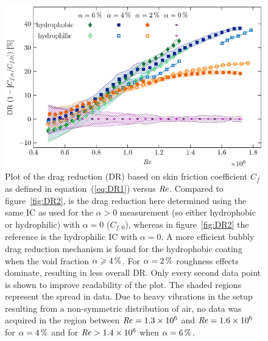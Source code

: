 \begin{figure}
\centering \includegraphics{Figures/fig7}
\caption{Plot of the drag reduction (DR) based on skin friction coefficient $C_f$ as defined in equation~(\ref{eq:DR1}) versus $\mbox{\textit{Re}}$. Compared to figure~\ref{fig:DR2}, is the drag reduction here determined using the same IC as used for the $\alpha > 0$ measurement (so either hydrophobic or hydrophilic) with $\alpha = 0$ ($C_{f,0}$), whereas in figure~\ref{fig:DR2} the reference is the hydrophilic IC with $\alpha = 0$. A more efficient bubbly drag reduction mechanism is found for the hydrophobic coating when the void fraction $\alpha \geqslant \SI{4}{\percent}$. For $\alpha  = \SI{2}{\percent}$ roughness effects dominate, resulting in less overall DR. Only every second data point is shown to improve readability of the plot. The shaded regions represent the spread in data.  Due to heavy vibrations in the setup resulting from a non-symmetric distribution of air, no data was acquired in the region between $\mbox{\textit{Re}} = 1.3\times10^6$ and $\mbox{\textit{Re}} = 1.6\times10^6$ for $\alpha=\SI{4}{\percent}$ and for $\mbox{\textit{Re}} > 1.4\times10^6$ when $\alpha=\SI{6}{\percent}$.}\label{fig:DR1}
\end{figure}



